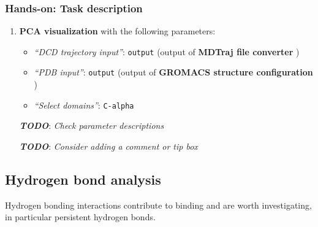 \documentclass[twocolumn]{bmcart}%
\providecommand{\tightlist}{%
  \setlength{\itemsep}{0pt}\setlength{\parskip}{0pt}}
\providecommand{\tightlist}{%
  \setlength{\itemsep}{0pt}\setlength{\parskip}{0pt}}
\begin{document}
\begin{handson_box_colour}

\hypertarget{hands-on-task-description-15}{%
\subsubsection{Hands-on: Task
description}\label{hands-on-task-description-15}}

\begin{enumerate}
\def\labelenumi{\arabic{enumi}.}
\tightlist
\item
  \textbf{PCA visualization} with the following parameters:

  \begin{itemize}
  \tightlist
  \item
    \emph{``DCD trajectory input''}: \texttt{output} (output of
    \textbf{MDTraj file converter} )
  \item
    \emph{``PDB input''}: \texttt{output} (output of \textbf{GROMACS
    structure configuration} )
  \item
    \emph{``Select domains''}: \texttt{C-alpha}
  \end{itemize}

  \textbf{\emph{TODO}}: \emph{Check parameter descriptions}

  \textbf{\emph{TODO}}: \emph{Consider adding a comment or tip box}
\end{enumerate}


\end{handson_box_colour}


\hypertarget{hydrogen-bond-analysis}{%
\subsection*{Hydrogen bond analysis}\label{hydrogen-bond-analysis}}

Hydrogen bonding interactions contribute to binding and are worth
investigating, in particular persistent hydrogen bonds.
\end{document}
